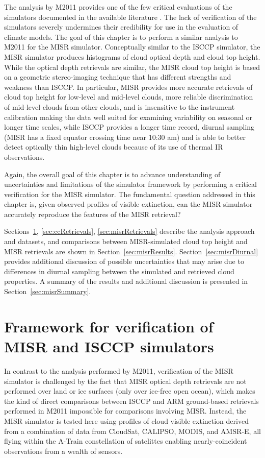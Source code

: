 The analysis by M2011 provides one of the few critical evaluations of
the simulators documented in the available literature \citep[see
also,][]{mace_et_al_2006, dimichele_et_al_2012}. The lack of
verification of the simulators severely undermines their credibility for
use in the evaluation of climate models. The goal of this chapter is to
perform a similar analysis to M2011 for the MISR simulator. Conceptually
similar to the ISCCP simulator, the MISR simulator produces histograms
of cloud optical depth and cloud top height. While the optical depth
retrievals are similar, the MISR cloud top height is based on a
geometric stereo-imaging technique that has different strengths and
weakness than ISCCP. In particular, MISR provides more accurate
retrievals of cloud top height for low-level and mid-level clouds, more
reliable discrimination of mid-level clouds from other clouds, and is
insensitive to the instrument calibration making the data well suited
for examining variability on seasonal or longer time scales, while ISCCP
provides a longer time record, diurnal sampling (MISR has a fixed
equator crossing time near 10:30 am) and is able to better detect
optically thin high-level clouds because of its use of thermal IR
observations.

Again, the overall goal of this chapter is to advance understanding of
uncertainties and limitations of the simulator framework by performing a
critical verification for the MISR simulator. The fundamental question
addressed in this chapter is, given observed profiles of visible
extinction, can the MISR simulator accurately reproduce the features of
the MISR retrieval?

Sections~\ref{sec:framework}, \ref{sec:ccRetrievals}, \ref{sec:misrRetrievals}
describe the analysis approach and datasets, and comparisons between
MISR-simulated cloud top height and MISR retrievals are shown in
Section~\ref{sec:misrResults}. Section~\ref{sec:misrDiurnal} provides
additional discussion of possible uncertainties that may arise due to
differences in diurnal sampling between the simulated and retrieved
cloud properties. A summary of the results and additional discussion is
presented in Section~\ref{sec:misrSummary}.

\section{Framework for verification of MISR and ISCCP
simulators}\label{sec:framework}

In contrast to the analysis performed by M2011, verification of the MISR
simulator is challenged by the fact that MISR optical depth retrievals
are not performed over land or ice surfaces (only over ice-free open
ocean), which makes the kind of direct comparisons between ISCCP and ARM
ground-based retrievals performed in M2011 impossible for comparisons
involving MISR. Instead, the MISR simulator is tested here using
profiles of cloud visible extinction derived from a combination of data
from CloudSat, CALIPSO, MODIS, and AMSR-E, all flying within the A-Train
constellation of satelittes enabling nearly-coincident observations from
a wealth of sensors.

